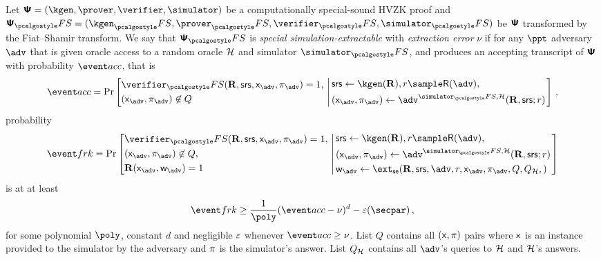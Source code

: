 \documentclass[runningheads,11pt]{llncs}
\begin{document}
\begin{definition}
	\label{def:simext}
	Let $\ps = (\kgen, \prover, \verifier, \simulator)$ be a computationally
  special-sound HVZK proof and
  $\ps_\fs = (\kgen_\fs, \prover_\fs, \verifier_\fs, \simulator_\fs)$ be $\bm{\mathsf{\Psi}}$
  transformed by the Fiat--Shamir transform. We say that $\ps_\fs$ is
  \emph{special simulation-extractable} with \emph{extraction error} $\nu$ if for any
  $\ppt$ adversary $\adv$ that is given oracle access to a random oracle $\mathcal{H}$
  and simulator $\simulator_\fs$, and produces an accepting transcript of $\bm{\mathsf{\Psi}}$
  with probability $\accProb$, that is
	\[
		\accProb = \Pr \left[
		\begin{aligned}
			& \verifier_\fs(\REL, \srs, \inp_{\advse}, \zkproof_{\advse}) = 1,\\
			& (\inp_{\advse}, \zkproof_{\advse}) \not\in Q
		\end{aligned}
		\, \left| \,
		\begin{aligned}
			& \srs \gets \kgen(\REL), r \sample \RND{\advse}, \\
			& (\inp_{\advse}, \zkproof_{\advse}) \gets \advse^{\simulator_\fs,
			\ro} (\REL, \srs; r) 
		\end{aligned}
		\right.\right]\,,
	\]
	probability
	\[
		\frkProb = \Pr \left[
		\begin{aligned}
			& \verifier_\fs(\REL, \srs, \inp_{\advse}, \zkproof_{\advse}) = 1,\\
			& (\inp_{\advse}, \zkproof_{\advse}) \not\in Q,\\
			& \REL(\inp_{\advse}, \wit_{\advse}) = 1
		\end{aligned}
		\, \left| \,
		\begin{aligned}
			& \srs \gets \kgen(\REL), r \sample \RND{\advse},\\
			& (\inp_{\advse}, \zkproof_{\advse}) \gets \advse^{\simulator_\fs,
			\ro} (\REL, \srs; r) \\
			& \wit_{\advse} \gets \ext_\se (\REL, \srs, \advse, r, \inp_{\advse}, \zkproof_{\advse},
			Q, Q_\ro,) 
		\end{aligned}
		\right.\right]
	\]
	is at at least 
	\[
		\frkProb \geq \frac{1}{\poly} (\accProb - \nu)^d - \eps(\secpar)\,,
	\]
	for some polynomial $\poly$, constant $d$ and negligible $\varepsilon$ whenever
  $\accProb \geq \nu$. List $Q$ contains all $(\mathsf{x}, \pi)$ pairs where
  $\mathsf{x}$ is an instance provided to the simulator by the adversary and
  $\pi$ is the simulator's answer. List $Q_{\mathcal{H}}$ contains all $\advse$'s
  queries to $\mathcal{H}$ and $\mathcal{H}$'s answers.
\end{definition}
\end{document}
